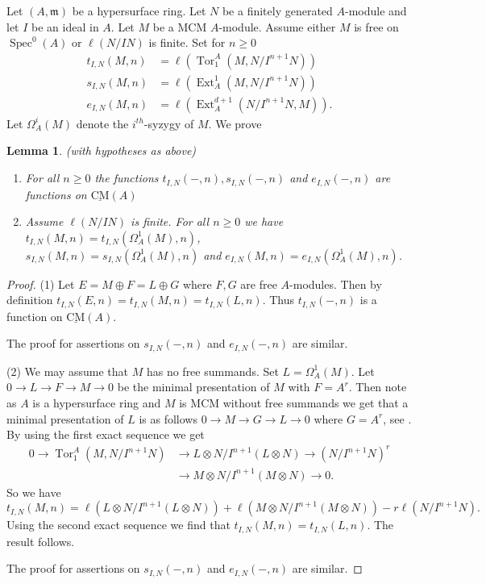 \documentclass{amsart}
\newcommand{\m}{\mathfrak{m} }
\newcommand{\rt}{\rightarrow}
\newcommand{\Tor}{\operatorname{Tor}}
\newcommand{\Spec}{\operatorname{Spec}}
\newcommand{\CMS}{\operatorname{\underline{CM}}}
\newcommand{\Ext}{\operatorname{Ext}}
\theoremstyle{plain}
\newtheorem{lemma}[theorem]{Lemma}
\theoremstyle{definition}
\theoremstyle{remark}
\begin{document}
\s Let $(A,\m)$ be a hypersurface ring. Let $N$ be a finitely generated $A$-module and let $I$ be an  ideal in $A$.
Let $M$ be a MCM $A$-module. Assume either $M$ is free on $\Spec^0(A)$ or $\ell(N/IN)$ is finite.
Set for $n \geq 0$
\begin{align*}
  t_{I, N}(M,n) &=  \ell(\Tor^A_1(M, N/I^{n+1}N)) \\
  s_{I, N}(M,n) &= \ell(\Ext^1_A(M, N/I^{n+1}N)) \\
  e_{I, N}(M, n) &= \ell(\Ext^{d+1}_A( N/I^{n+1}N, M)).
\end{align*}
Let $\Omega^i_A(M)$ denote the $i^{th}$-syzygy of $M$.
We prove
\begin{lemma}\label{basic}
(with hypotheses as above)
\begin{enumerate}[\rm (1)]
  \item For all $n \geq 0$  the functions $t_{I, N}(-,n), s_{I, N}(-,n)$ and $e_{I, N}(-,n)$ are functions on $\CMS(A)$
  \item Assume $\ell(N/IN)$ is finite.
  For all $n \geq 0$ we have $t_{I, N}(M,n) = t_{I, N}(\Omega^1_A(M),n)$, \\ $s_{I, N}(M,n) = s_{I, N}(\Omega^1_A(M),n)$ and $e_{I, N}(M,n) = e_{I, N}(\Omega^1_A(M),n)$.
\end{enumerate}
\end{lemma}
\begin{proof}
(1) Let $E = M \oplus F = L \oplus G$ where $F, G$ are free $A$-modules. Then by definition
$t_{I, N}(E, n) = t_{I, N}(M,n) = t_{I, N}(L,n)$. Thus $t_{I, N}(-, n)$ is a function on $\CMS(A)$.

 The proof for assertions on $s_{I, N}(-, n)$ and $e_{I, N}(-, n)$ are similar.

(2) We may assume that $M$ has no free summands. Set $L = \Omega_A^1(M)$.  Let $ 0 \rt L  \rt F \rt M \rt 0$ be the minimal presentation of $M$ with $F = A^r$. Then note as $A$ is a hypersurface ring and $M$ is MCM without free summands we get that a minimal presentation of $L$ is as follows $0 \rt M \rt G \rt L \rt 0$ where $G = A^r$,  see \cite[6.1(ii)]{E}.
By using the first exact sequence we get
\begin{align*}
0 \rt \Tor^A_1(M, N/I^{n+1}N) &\rt L\otimes N/I^{n+1}(L\otimes N)\rt (N/I^{n+1}N)^r\\
&\rt M\otimes N/I^{n+1}(M\otimes N) \rt 0.
\end{align*}
So we have
\[
t_{I, N}(M,n) = \ell(L\otimes N/I^{n+1}(L\otimes N)) + \ell(M\otimes N/I^{n+1}(M\otimes N)) - r\ell(N/I^{n+1}N).
\]
Using the second exact sequence we find that $t_{I, N}(M,n) = t_{I, N}(L,n)$. The result follows.

The proof for assertions on $s_{I, N}(-, n)$ and $e_{I, N}(-, n)$ are similar.
\end{proof}
\end{document}
